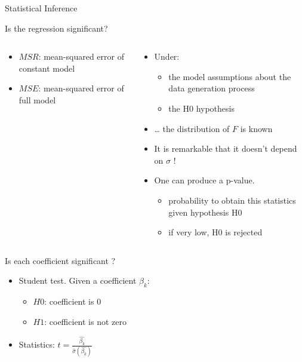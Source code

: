 \documentclass[
  ignorenonframetext,
  aspectratio=169,
]{beamer}
\providecommand{\tightlist}{%
  \setlength{\itemsep}{0pt}\setlength{\parskip}{0pt}}\usepackage{longtable,booktabs,array}
\begin{document}
\begin{frame}{Statistical Inference}
\begin{block}{Is the regression significant?}
\begin{columns}[T]
\begin{column}{0.48\textwidth}
\begin{itemize}
  \begin{itemize}
  \tightlist
  \item
    \(MSR\): mean-squared error of constant model
  \item
    \(MSE\): mean-squared error of full model
  \end{itemize}
\end{itemize}
\end{column}

\begin{column}{0.48\textwidth}
\begin{itemize}
\item
  Under:

  \begin{itemize}
  \tightlist
  \item
    the model assumptions about the data generation process
  \item
    the H0 hypothesis
  \end{itemize}
\item
  \ldots{} the distribution of \(F\) is known
\item
  It is remarkable that it doesn't depend on \(\sigma\) !
\item
  One can produce a p-value.

  \begin{itemize}
  \tightlist
  \item
    probability to obtain this statistics given hypothesis H0
  \item
    if very low, H0 is rejected
  \end{itemize}
\end{itemize}
\end{column}
\end{columns}
\end{block}

\begin{block}{Is each coefficient significant ?}
\protect\hypertarget{is-each-coefficient-significant}{}
\begin{itemize}
\tightlist
\item
  Student test. Given a coefficient \(\beta_k\):

  \begin{itemize}
  \tightlist
  \item
    \(H0\): coefficient is 0
  \item
    \(H1\): coefficient is not zero
  \end{itemize}
\item
  Statistics: \(t = \frac{\hat{\beta_k}}{\hat{\sigma}(\hat{\beta_k})}\)


\end{itemize}
\end{block}
\end{frame}
\end{document}
